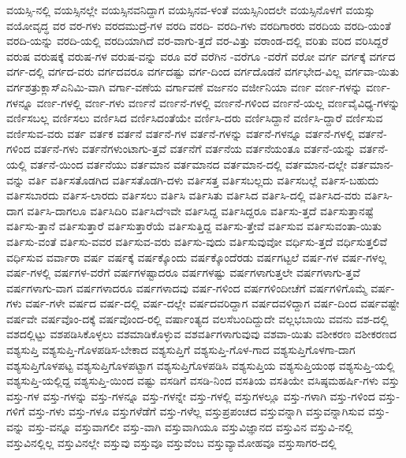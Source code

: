 {ವಯಸ್ಸಿ-ನಲ್ಲಿ
ವಯಸ್ಸಿನಲ್ಲೇ
ವಯಸ್ಸಿನವನಿದ್ದಾಗ
ವಯಸ್ಸಿನವ-ಳಂತೆ
ವಯಸ್ಸಿನಿಂದಲೇ
ವಯಸ್ಸಿನೊಳಗೆ
ವಯಸ್ಸು
ವಯೋವೃದ್ಧ
ವರ
ವರ-ಗಳು
ವರದಮುದ್ರೆ-ಗಳ
ವರದಿ
ವರದಿ-
ವರದಿ-ಗಳು
ವರದಿಗಾರರು
ವರದಿಯ
ವರದಿ-ಯಂತೆ
ವರದಿ-ಯನ್ನು
ವರದಿ-ಯಲ್ಲಿ
ವರದಿಯಾಗಿದೆ
ವರ-ವಾಗು-ತ್ತದೆ
ವರ-ವಿತ್ತು
ವರಾಂಡ-ದಲ್ಲಿ
ವರಿತು
ವರಿದ
ವರಿಸಿದ್ದರೆ
ವರುಷ
ವರುಷಕ್ಕೆ
ವರುಷ-ಗಳ
ವರುಷ-ವನ್ನು
ವರೂ
ವರೆ
ವರೆಗಿನ
-ವರೆಗೂ
-ವರೆಗೆ
ವರೋ
ವರ್ಗ
ವರ್ಗಕ್ಕೆ
ವರ್ಗದ
ವರ್ಗ-ದಲ್ಲಿ
ವರ್ಗದ-ವರು
ವರ್ಗದವರೂ
ವರ್ಗದಷ್ಟು
ವರ್ಗ-ದಿಂದ
ವರ್ಗದೊಡನೆ
ವರ್ಗಭೇದ-ವಿಲ್ಲ
ವರ್ಗವಾ-ಯಿತು
ವರ್ಗಶತ್ರುಕ್ಲಾಸ್ಎನಿಮಿ-ವಾಗಿ
ವರ್ಗಾ-ವಣೆಯ
ವರ್ಗಾವಣೆ
ವರ್ಜನಂ
ವರ್ಜೀನಿಯಾ
ವರ್ಣ
ವರ್ಣ-ಗಳನ್ನು
ವರ್ಣ-ಗಳನ್ನೂ
ವರ್ಣ-ಗಳಲ್ಲಿ
ವರ್ಣ-ಗಳು
ವರ್ಣನೆ
ವರ್ಣನೆ-ಗಳಲ್ಲಿ
ವರ್ಣನೆ-ಗಳಿಂದ
ವರ್ಣನೆ-ಯಲ್ಲ
ವರ್ಣವೈವಿಧ್ಯ-ಗಳನ್ನು
ವರ್ಣಿಸಬಲ್ಲ
ವರ್ಣಿಸಲು
ವರ್ಣಿಸಿದ
ವರ್ಣಿಸಿದಂತೆಯೇ
ವರ್ಣಿಸಿ-ದರು
ವರ್ಣಿಸಿದ್ದಾನೆ
ವರ್ಣಿಸಿ-ದ್ದಾರೆ
ವರ್ಣಿಸುವ
ವರ್ಣಿಸುವ-ವರು
ವರ್ತ
ವರ್ತಕ
ವರ್ತನೆ
ವರ್ತನೆ-ಗಳ
ವರ್ತನೆ-ಗಳನ್ನು
ವರ್ತನೆ-ಗಳನ್ನೂ
ವರ್ತನೆ-ಗಳಲ್ಲಿ
ವರ್ತನೆ-ಗಳಿಂದ
ವರ್ತನೆ-ಗಳು
ವರ್ತನೆಗಳುಂಟಾಗು-ತ್ತವೆ
ವರ್ತನೆಗೆ
ವರ್ತನೆಯ
ವರ್ತನೆಯಂತೂ
ವರ್ತನೆ-ಯನ್ನು
ವರ್ತನೆ-ಯಲ್ಲಿ
ವರ್ತನೆ-ಯಿಂದ
ವರ್ತನೆಯು
ವರ್ತಮಾನ
ವರ್ತಮಾನದ
ವರ್ತಮಾನ-ದಲ್ಲಿ
ವರ್ತಮಾನ-ದಲ್ಲೇ
ವರ್ತಮಾನ-ವನ್ನು
ವರ್ತಿ
ವರ್ತಿಸತೊಡಗಿದ
ವರ್ತಿಸತೊಡಗಿ-ದಳು
ವರ್ತಿಸತ್ತ
ವರ್ತಿಸಬಲ್ಲದು
ವರ್ತಿಸಬಲ್ಲೆ
ವರ್ತಿಸ-ಬಹುದು
ವರ್ತಿಸಬಾರದು
ವರ್ತಿಸ-ಲಾರದು
ವರ್ತಿಸಲು
ವರ್ತಿಸಿ
ವರ್ತಿಸಿತು
ವರ್ತಿಸಿದ
ವರ್ತಿಸಿ-ದಲ್ಲಿ
ವರ್ತಿಸಿದ-ವರು
ವರ್ತಿಸಿ-ದಾಗ
ವರ್ತಿಸಿ-ದಾಗಲೂ
ವರ್ತಿಸಿದಿರಿ
ವರ್ತಿಸಿದೆಇವೇ
ವರ್ತಿಸಿದ್ದ
ವರ್ತಿಸಿದ್ದರೂ
ವರ್ತಿಸು-ತ್ತದೆ
ವರ್ತಿಸುತ್ತಾನಷ್ಟೆ
ವರ್ತಿಸು-ತ್ತಾನೆ
ವರ್ತಿಸುತ್ತಾರೆ
ವರ್ತಿಸುತ್ತಾರೆಯೆ
ವರ್ತಿಸುತ್ತಿದ್ದ
ವರ್ತಿಸು-ತ್ತೇವೆ
ವರ್ತಿಸುವ
ವರ್ತಿಸುವಂತಾ-ಯಿತು
ವರ್ತಿಸು-ವಂತೆ
ವರ್ತಿಸು-ವವರ
ವರ್ತಿಸುವ-ವರು
ವರ್ತಿಸು-ವುದು
ವರ್ತಿಸುವುವೋ
ವರ್ಧಿಸು-ತ್ತದೆ
ವರ್ಧಿಸುತ್ತಲಿವೆ
ವರ್ಧಿಸುವ
ವರ್ವಾರಾ
ವರ್ಷ
ವರ್ಷಕ್ಕೆ
ವರ್ಷಕ್ಕೊಂದು
ವರ್ಷಕ್ಕೊಂದೆರಡು
ವರ್ಷಗಟ್ಟಲೆ
ವರ್ಷ-ಗಳ
ವರ್ಷ-ಗಳಲ್ಲ
ವರ್ಷ-ಗಳಲ್ಲಿ
ವರ್ಷಗಳ-ವರೆಗೆ
ವರ್ಷಗಳಷ್ಟಾದರೂ
ವರ್ಷಗಳಷ್ಟು
ವರ್ಷಗಳಾಗುತ್ತಲೇ
ವರ್ಷಗಳಾಗು-ತ್ತವೆ
ವರ್ಷಗಳಾಗು-ವಾಗ
ವರ್ಷಗಳಾದರೂ
ವರ್ಷಗಳಾದವು
ವರ್ಷ-ಗಳಿಂದ
ವರ್ಷಗಳಿಂದೀಚೆಗೆ
ವರ್ಷಗಳಿಗೊಮ್ಮೆ
ವರ್ಷ-ಗಳು
ವರ್ಷ-ಗಳೇ
ವರ್ಷದ
ವರ್ಷ-ದಲ್ಲಿ
ವರ್ಷ-ದಲ್ಲೇ
ವರ್ಷದವರಿದ್ದಾಗ
ವರ್ಷದವಳಿದ್ದಾಗ
ವರ್ಷ-ದಿಂದ
ವರ್ಷವಷ್ಟೇ
ವರ್ಷವೇ
ವರ್ಷವೊಂ-ದಕ್ಕೆ
ವರ್ಷವೊಂದ-ರಲ್ಲಿ
ವರ್ಷಾಂತ್ಯದ
ವಲಸೆಬಂದಿದ್ದುದೇ
ವಲ್ಲಭಬಾಯಿ
ವವನು
ವಶ-ದಲ್ಲಿ
ವಶದಲ್ಲಿಟ್ಟು
ವಶಪಡಿಸಿಕೊಳ್ಳಲು
ವಶಮಾಡಿಕೊಳ್ಳುವ
ವಶವರ್ತಿಗಳಾಗುವುವು
ವಶವಾ-ಯಿತು
ವಶೀಕರಣ
ವಶೀಕರಣದ
ವಶ್ಯಸುಪ್ತಿ
ವಶ್ಯಸುಪ್ತಿ-ಗೊಳಪಡಿಸ-ಬೇಕಾದ
ವಶ್ಯಸುಪ್ತಿಗೆ
ವಶ್ಯಸುಪ್ತಿ-ಗೊಳ-ಗಾದ
ವಶ್ಯಸುಪ್ತಿಗೊಳಗಾ-ದಾಗ
ವಶ್ಯಸುಪ್ತಿಗೊಳಪಟ್ಟ
ವಶ್ಯಸುಪ್ತಿಗೊಳಪಟ್ಟಾಗ
ವಶ್ಯಸುಪ್ತಿಗೊಳಪಡಿಸಿ
ವಶ್ಯಸುಪ್ತಿಯ
ವಶ್ಯಸುಪ್ತಿಯಂಥ
ವಶ್ಯಸುಪ್ತಿ-ಯಲ್ಲಿ
ವಶ್ಯಸುಪ್ತಿ-ಯಲ್ಲಿದ್ದ
ವಶ್ಯಸುಪ್ತಿ-ಯಿಂದ
ವಷ್ಟು
ವಸಡಿಗೆ
ವಸಡಿ-ನಿಂದ
ವಸತಿಯ
ವಸತಿಯೇ
ವಸಿಷ್ಠಮಹರ್ಷಿ-ಗಳು
ವಸ್ತು
ವಸ್ತು-ಗಳ
ವಸ್ತು-ಗಳನ್ನು
ವಸ್ತು-ಗಳನ್ನೂ
ವಸ್ತು-ಗಳನ್ನೇ
ವಸ್ತು-ಗಳಲ್ಲಿ
ವಸ್ತುಗಳಲ್ಲೂ
ವಸ್ತು-ಗಳಾಗಿ
ವಸ್ತು-ಗಳಿಂದ
ವಸ್ತು-ಗಳಿಗೆ
ವಸ್ತು-ಗಳು
ವಸ್ತು-ಗಳೂ
ವಸ್ತುಗಳೆಡೆಗೆ
ವಸ್ತು-ಗಳೆಲ್ಲ
ವಸ್ತುಪ್ರಪಂಚದ
ವಸ್ತುವನ್ನಾಗಿ
ವಸ್ತುವನ್ನಾಗಿಸುವ
ವಸ್ತು-ವನ್ನು
ವಸ್ತು-ವನ್ನೂ
ವಸ್ತುವಾಗಲೀ
ವಸ್ತು-ವಾಗಿ
ವಸ್ತುವಾಗಿಯೂ
ವಸ್ತುವಿಜ್ಞಾನದ
ವಸ್ತುವಿನ
ವಸ್ತುವಿ-ನಲ್ಲಿ
ವಸ್ತುವಿನಲ್ಲಿಲ್ಲ
ವಸ್ತುವಿನಲ್ಲೇ
ವಸ್ತುವು
ವಸ್ತುವೂ
ವಸ್ತುವೆಂಬ
ವಸ್ತುವ್ಯಾಮೋಹವೂ
ವಸ್ತುಸಾಗರ-ದಲ್ಲಿ
}
